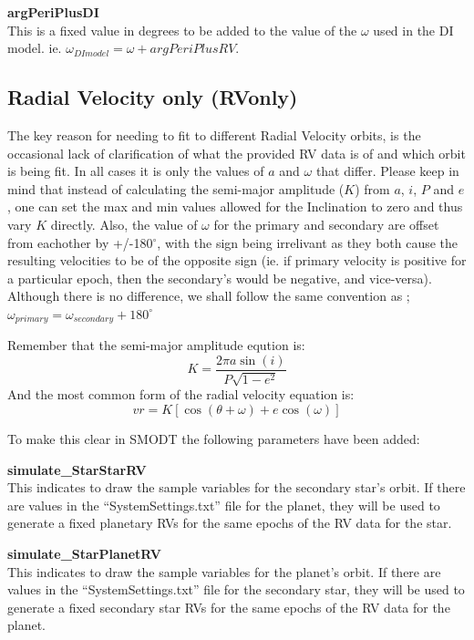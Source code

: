 \documentclass[12pt,preprint]{aastex}
\begin{document}
{\bf argPeriPlusDI}\\
This is a fixed value in degrees to be added to the value of the $\omega$ used in the DI model. ie. $\omega_{DImodel}=\omega+argPeriPlusRV$.
\subsection{Radial Velocity only (RVonly)}
The key reason for needing to fit to different Radial Velocity orbits, is the occasional lack of clarification of what the provided RV data is of and which orbit is being fit.  In all cases it is only the values of $a$ and $\omega$ that differ.  Please keep in mind that instead of calculating the semi-major amplitude ($K$) from $a$, $i$, $P$ and $e$, one can set the max and min values allowed for the Inclination to zero and thus vary $K$ directly.  Also, the value of $\omega$ for the primary and secondary are offset from eachother by +/-180$^{\circ}$, with the sign being irrelivant as they both cause the resulting velocities to be of the opposite sign (ie. if primary velocity is positive for a particular epoch, then the secondary's would be negative, and vice-versa).  Although there is no difference, we shall follow the same convention as \citet{Shulze-Hartung}; $\omega_{primary} = \omega_{secondary} +180^{\circ}$

Remember that the semi-major amplitude eqution is:
\begin{equation}\label{eq:Ksimple}
K = \frac{2\pi a\sin(i)}{P\sqrt{1-e^2}}
\end{equation}
And the most common form of the radial velocity equation is:
\begin{equation}\label{eq:rvStandard1}
vr =  K[\cos(\theta+\omega)+e \cos(\omega)]
\end{equation}

To make this clear in SMODT the following parameters have been added:


{\bf simulate\_StarStarRV}\\
This indicates to draw the sample variables for the secondary star's orbit.  If there are values in the ``SystemSettings.txt'' file for the planet, they will be used to generate a fixed planetary RVs for the same epochs of the RV data for the star.

{\bf simulate\_StarPlanetRV}\\
This indicates to draw the sample variables for the planet's orbit.  If there are values in the ``SystemSettings.txt'' file for the secondary star, they will be used to generate a fixed secondary star RVs for the same epochs of the RV data for the planet.
\end{document}

